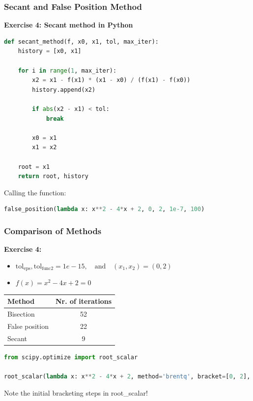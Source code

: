 \begin{frame}[fragile]
  \frametitle{Secant and False Position Method}

  \textbf{Exercise 4: Secant method in Python}
  \begin{lstlisting}[language=Python, basicstyle=\scriptsize]
def secant_method(f, x0, x1, tol, max_iter):
    history = [x0, x1]
    
    for i in range(1, max_iter):
        x2 = x1 - f(x1) * (x1 - x0) / (f(x1) - f(x0))
        history.append(x2)

        if abs(x2 - x1) < tol:
            break

        x0 = x1
        x1 = x2

    root = x1
    return root, history
  \end{lstlisting}
  
  Calling the function:
  \begin{lstlisting}[language=Python, basicstyle=\small]
false_position(lambda x: x**2 - 4*x + 2, 0, 2, 1e-7, 100)
  \end{lstlisting}
\end{frame}

\begin{frame}[fragile]
  \frametitle{Comparison of Methods}

  \textbf{Exercise 4:}
  \begin{itemize}
    \item \( \text{tol}_{\text{eps}}, \text{tol}_{\text{func2}} = 1e-15, \quad \text{and} \quad (x_1, x_2) = (0,2) \)
    \item \( f(x) = x^2 - 4x + 2 = 0 \)
  \end{itemize}

  \begin{table}
      \begin{tabular}{|l|c|}
          \hline
          Method & Nr. of iterations \\
          \hline
          Bisection & 52 \\
          False position & 22 \\
          Secant & 9 \\
          \hline
      \end{tabular}
  \end{table}

  \begin{lstlisting}[language=Python, basicstyle=\small]
from scipy.optimize import root_scalar

root_scalar(lambda x: x**2 - 4*x + 2, method='brentq', bracket=[0, 2], xtol=1e-15)
  \end{lstlisting}
  
  Note the initial bracketing steps in root\_scalar!
\end{frame}

